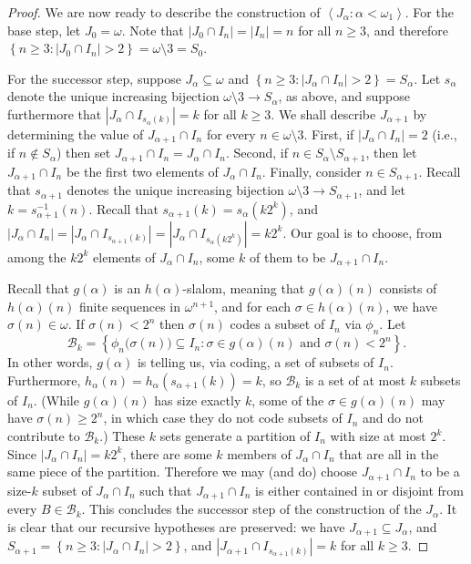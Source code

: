\documentclass[10pt,a4paper]{amsart}
\newcommand{\B}{\mathcal{B}}
\renewcommand{\a}{\alpha}
\newcommand{\brackets}[1]{\left\langle #1 \right\rangle}
\newcommand{\explicitSet}[1]{\left\lbrace #1 \right\rbrace}
\newcommand{\s}{\sigma}
\newcommand{\seq}[2]{\brackets{#1 \colon #2}}
\newcommand{\set}[2]{\explicitSet{#1 \colon #2}}
\newcommand{\sub}{\subseteq}
\newcommand{\w}{\omega}
\begin{document}
\begin{proof}
We are now ready to describe the construction of $\seq{J_\a}{\a < \w_1}$. 
For the base step, let $J_0 = \w$. Note that $|J_0 \cap I_n| = |I_n| = n$ for all $n \geq 3$, and therefore $\set{n \geq 3}{|J_0 \cap I_n| > 2} = \w \setminus 3 = S_0$. 

For the successor step, suppose $J_\a \sub \w$ and $\set{n \geq 3}{|J_\a \cap I_n| > 2} = S_\a$. Let $s_\a$ denote the unique increasing bijection $\w \setminus 3 \to S_\a$, as above, and suppose furthermore that $|J_\a \cap I_{s_\a(k)}| = k$ for all $k \geq 3$. 
We shall describe $J_{\a+1}$ by determining the value of $J_{\a+1} \cap I_n$ for every $n \in \w \setminus 3$. 
First, if $|J_\a \cap I_n| = 2$ (i.e., if $n \notin S_\a$) then set $J_{\a+1} \cap I_n = J_\a \cap I_n$. 
Second, if $n \in S_\a \setminus S_{\a+1}$, then let $J_{\a+1} \cap I_n$ be the first two elements of $J_\a \cap I_n$. 
Finally, consider $n \in S_{\a+1}$. 
Recall that $s_{\a+1}$ denotes the unique increasing bijection $\w \setminus 3 \to S_{\a+1}$, and let $k = s_{\a+1}^{-1}(n)$. 
Recall that  $s_{\a+1}(k) = s_\a(k2^k)$, and $|J_\a \cap I_n| = |J_\a \cap I_{s_{\a+1}(k)}| = |J_\a \cap I_{s_\a(k2^k)}| = k2^k$. Our goal is to choose, from among the $k2^k$ elements of $J_\a \cap I_n$, some $k$ of them to be $J_{\a+1} \cap I_n$. 

Recall that $g(\a)$ is an $h(\a)$-slalom, meaning that $g(\a)(n)$ consists of $h(\a)(n)$ finite sequences in $\w^{n+1}$, and for each $\s \in h(\a)(n)$, we have $\s(n) \in \w$. If $\s(n) < 2^n$ then $\s(n)$ codes a subset of $I_n$ via $\phi_n$. 
Let 
$$\B_k = \set{\phi_n\big(\s(n)\big) \sub I_n}{\s \in g(\a)(n) \text{ and }\s(n) < 2^n}.$$ 
In other words, $g(\a)$ is telling us, via coding, a set of subsets of $I_n$. 
Furthermore, $h_{\a}(n) = h_{\a}(s_{\a+1}(k)) = k$, so 
$\B_k$ is a set of at most $k$ subsets of $I_n$. 
(While $g(\a)(n)$ has size exactly $k$, some of the $\s \in g(\a)(n)$ may have $\s(n) \geq 2^n$, in which case they do not code subsets of $I_n$ and do not contribute to $\B_k$.) 
These $k$ sets generate a partition of $I_n$ with size at most $2^k$. 
Since $|J_\a \cap I_n| = k2^k$, there are some $k$ members of $J_\a \cap I_n$ that are all in the same piece of the partition. 
Therefore we may (and do) choose $J_{\a+1} \cap I_n$ to be a size-$k$ subset of $J_\a \cap I_n$ such that $J_{\a+1} \cap I_n$ is either contained in or disjoint from every $B \in \B_k$. 
This concludes the successor step of the construction of the $J_\a$. 
It is clear that our recursive hypotheses are preserved: we have $J_{\a+1} \sub J_\a$, and $S_{\a+1} = \set{n \geq 3}{|J_\a \cap I_n| > 2}$, and $|J_{\a+1} \cap I_{s_{\a+1}(k)}| = k$ for all $k \geq 3$. 


\end{proof}
\end{document}
